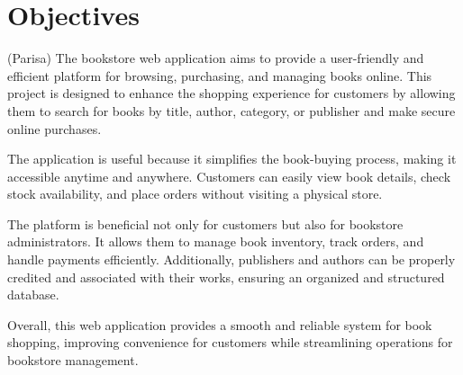 \section{Objectives}


(Parisa)
The bookstore web application aims to provide a user-friendly and efficient platform for browsing, purchasing, and managing books online. This project is designed to enhance the shopping experience for customers by allowing them to search for books by title, author, category, or publisher and make secure online purchases.

The application is useful because it simplifies the book-buying process, making it accessible anytime and anywhere. Customers can easily view book details, check stock availability, and place orders without visiting a physical store.

The platform is beneficial not only for customers but also for bookstore administrators. It allows them to manage book inventory, track orders, and handle payments efficiently. Additionally, publishers and authors can be properly credited and associated with their works, ensuring an organized and structured database.

Overall, this web application provides a smooth and reliable system for book shopping, improving convenience for customers while streamlining operations for bookstore management.